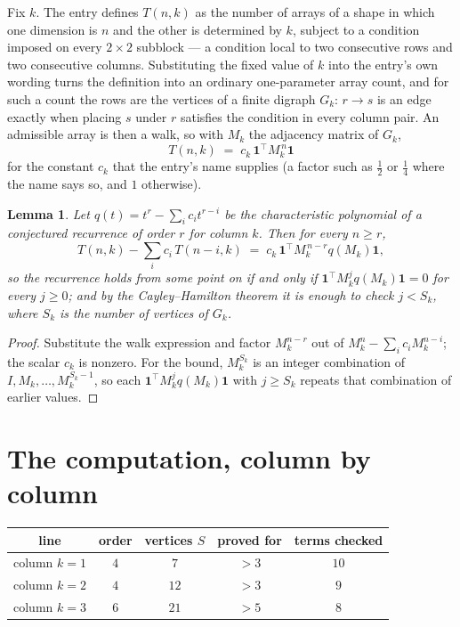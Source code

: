 \documentclass[11pt,a4paper]{article}
\theoremstyle{plain}
\newtheorem{lemma}[theorem]{Lemma}
\theoremstyle{definition}
\begin{document}
Fix $k$. The entry defines $T(n,k)$ as the number of arrays of a shape in which one dimension
is $n$ and the other is determined by $k$, subject to a condition imposed on every
$2\times2$ subblock --- a condition local to two consecutive rows and two consecutive columns.
Substituting the fixed value of $k$ into the entry's own wording turns the definition into an
ordinary one-parameter array count, and for such a count the rows are the vertices of a finite
digraph $G_k$: $r\to s$ is an edge exactly when placing $s$ under $r$ satisfies the condition
in every column pair. An admissible array is then a walk, so with $M_k$ the adjacency matrix
of $G_k$,
\[
T(n,k)\;=\;c_k\,\mathbf{1}^{\!\top}M_k^{\,n}\mathbf{1}
\]
for the constant $c_k$ that the entry's name supplies (a factor such as $\tfrac12$ or
$\tfrac14$ where the name says so, and $1$ otherwise).

\begin{lemma}\label{lem:crit}
Let $q(t)=t^{r}-\sum_i c_it^{r-i}$ be the characteristic polynomial of a conjectured
recurrence of order $r$ for column $k$. Then for every $n\ge r$,
\[
T(n,k)-\sum_i c_i\,T(n-i,k)\;=\;c_k\,\mathbf{1}^{\!\top}M_k^{\,n-r}q(M_k)\mathbf{1},
\]
so the recurrence holds from some point on if and only if
$\mathbf{1}^{\!\top}M_k^{j}q(M_k)\mathbf{1}=0$ for every $j\ge0$; and by the
Cayley--Hamilton theorem it is enough to check $j<S_k$, where $S_k$ is the number of vertices
of $G_k$.
\end{lemma}

\begin{proof}
Substitute the walk expression and factor $M_k^{n-r}$ out of $M_k^{n}-\sum_ic_iM_k^{n-i}$;
the scalar $c_k$ is nonzero. For the bound, $M_k^{S_k}$ is an integer combination of
$I,M_k,\dots,M_k^{S_k-1}$, so each $\mathbf{1}^{\!\top}M_k^{j}q(M_k)\mathbf{1}$ with
$j\ge S_k$ repeats that combination of earlier values.
\end{proof}

\section{The computation, column by column}

\begin{center}
\begin{tabular}{ccccc}
line & order & vertices $S$ & proved for & terms checked \\ \hline
column $k$$=1$ & $4$ & $7$ & $>3$ & $10$ \\
column $k$$=2$ & $4$ & $12$ & $>3$ & $9$ \\
column $k$$=3$ & $6$ & $21$ & $>5$ & $8$ \\
\end{tabular}
\end{center}
\end{document}
